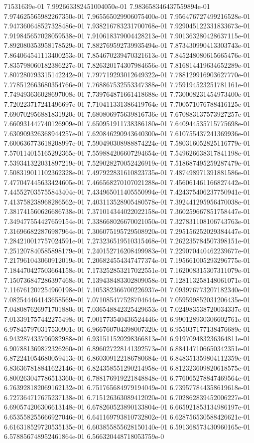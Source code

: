 71531639e-01	7.992663382451004050e-01	7.983658346437559894e-01	7.974625565982267350e-01	7.965565029906075400e-01	7.956476727499216528e-01	7.947360648527328486e-01	7.938216783231700768e-01	7.929045122331833673e-01	7.919845657028059538e-01	7.910618379004428213e-01	7.901363280428637115e-01	7.892080353958178529e-01	7.882769592739935494e-01	7.873430990413303743e-01	7.864064541113400253e-01	7.854670239470321613e-01	7.845248080615665476e-01	7.835798060182386227e-01	7.826320174307984656e-01	7.816814419634652289e-01	7.807280793315142242e-01	7.797719293012649322e-01	7.788129916903627770e-01	7.778512663680354766e-01	7.768867532553347388e-01	7.759194523251781161e-01	7.749493636028697008e-01	7.739764871661418688e-01	7.730008231454973400e-01	7.720223717241496697e-01	7.710411331386419764e-01	7.700571076788416125e-01	7.690702956881831920e-01	7.680806975639816736e-01	7.670883137573927257e-01	7.660931447740126909e-01	7.650951911738386180e-01	7.640944535715775698e-01	7.630909326368944257e-01	7.620846290943640300e-01	7.610755437241369936e-01	7.600636773618208997e-01	7.590490308988874224e-01	7.580316052825116779e-01	7.570114015165292365e-01	7.559884206607294654e-01	7.549626638317841198e-01	7.539341322031897219e-01	7.529028270052426919e-01	7.518687495259287479e-01	7.508319011102362328e-01	7.497922831610823735e-01	7.487498971391881586e-01	7.477047445633424605e-01	7.466568270107021288e-01	7.456061461166827442e-01	7.445527035755843404e-01	7.434965011405550994e-01	7.424375406237750941e-01	7.413758238968286562e-01	7.403113528905480578e-01	7.392441295956470038e-01	7.381741560626686738e-01	7.371014344022022158e-01	7.360259667851758447e-01	7.349477554427659154e-01	7.338668026670021050e-01	7.327831108106743763e-01	7.316966822876987964e-01	7.306075195729508920e-01	7.295156252029384447e-01	7.284210017757024591e-01	7.273236519510315468e-01	7.262235784507398151e-01	7.251207840585898179e-01	7.240152716208499983e-01	7.229070440462239677e-01	7.217961043060912019e-01	7.206824554347477374e-01	7.195661005293296775e-01	7.184470427503664158e-01	7.173252853217022551e-01	7.162008315307311079e-01	7.150736847286397468e-01	7.139438483302809058e-01	7.128113258148061071e-01	7.116761207254960198e-01	7.105382366700226937e-01	7.093976773207182340e-01	7.082544464143658569e-01	7.071085477528704644e-01	7.059599852031206435e-01	7.048087626971701880e-01	7.036548842325429653e-01	7.024983538720034337e-01	7.013391757442275498e-01	7.001773540436524446e-01	6.990128930306602761e-01	6.978457970317530901e-01	6.966760704398007320e-01	6.955037177138476689e-01	6.943287433796982988e-01	6.931511520298366813e-01	6.919709483236364811e-01	6.907881369872326260e-01	6.896027228141392573e-01	6.884147106650342351e-01	6.872241054680059413e-01	6.860309122186780684e-01	6.848351359804112359e-01	6.836367818841622146e-01	6.824358551290214958e-01	6.812323609820618575e-01	6.800263047786513360e-01	6.788176919221848848e-01	6.776065278847469564e-01	6.763928182069162132e-01	6.751765684979194049e-01	6.739577844358619618e-01	6.727364717675237138e-01	6.715126363089412020e-01	6.702862839452006227e-01	6.690574206306613148e-01	6.678260523890133804e-01	6.665921853134986197e-01	6.653558255666927046e-01	6.641169793810732802e-01	6.628756530588426621e-01	6.616318529720535135e-01	6.603855855628150140e-01	6.591368573430960165e-01	6.578856748952461864e-01	6.566320448718053759e-0